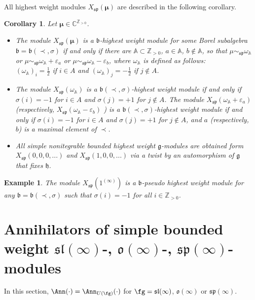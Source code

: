 \documentclass[12pt]{amsart}
\newcommand{\Z}{{\mathbb Z}}
\def\gb{\mathfrak{b}}
\def\gg{\mathfrak{g}}
\def\gh{\mathfrak{h}}
\def\gl{\mathfrak{l}}
\def\go{\mathfrak{o}}
\def\gp{\mathfrak{p}}
\def\gs{\mathfrak{s}}
\def\Z{\mathbb{Z}}
\def\gh{\mathfrak h}
\newtheorem{cor}[thm]{Corollary}
\newtheorem{examp}[thm]{Example}
\begin{document}
All highest weight modules $X_{\mathfrak{sp}}(\boldsymbol{\mu})$ are described in the following corollary.
\begin{cor} \label{cor-class-hw-sp} Let $\boldsymbol{\mu} \in {\mathbb C}^{{\mathbb Z}_{>0}}$. 
\begin{itemize}
\item[(i)] The module  $X_{\mathfrak{sp}}(\boldsymbol{\mu})$  is a $\mathfrak b$-highest weight module for some Borel subalgebra  $\gb = \gb (\prec, \sigma)$ if and only if  there are  ${\mathbb A}\subset {\mathbb Z}_{>0}$, $a \in {\mathbb A}$, $b \notin {\mathbb A}$, so that $\mu  \sim_{\mathfrak{sp}} \omega_{\mathbb A}$ or $\mu  \sim_{\mathfrak{sp}} \omega_{\mathbb A} + \varepsilon_a$ or $\mu  \sim_{\mathfrak{sp}} \omega_{\mathbb A} -\varepsilon_b$, where  $\omega_{\mathbb A}$ is defined as follows: \\
$(\omega_{\mathbb A})_i = \frac{1}{2}$ if $i \in A$ and  
$(\omega_{\mathbb A})_j = -\frac{1}{2}$ if $j \notin A$.
\item[(ii)]  The module  $X_{\mathfrak{sp}}(\omega_{\mathbb A})$ is a $\mathfrak b (\prec, \sigma )$-highest weight module if and only if $\sigma(i) =-1$ for $i \in A$ and $\sigma(j) =+1$ for $j \notin A$.  The module   $X_{\mathfrak{sp}}(\omega_{\mathbb A} + \varepsilon_a)$ (respectively, $X_{\mathfrak{sp}}(\omega_{\mathbb A}  - \varepsilon_b)$ ) is a $\mathfrak b (\prec, \sigma )$-highest weight module if and only if $\sigma(i) =-1$ for $i \in A$ and $\sigma(j) =+1$ for $j \notin A$, and $a$ (respectively, $b$) is a maximal element of $\prec$.
\item[(iii)] All simple nonitegrable bounded highest weight $\gg$-modules are obtained form $X_{\mathfrak{sp}} (0,0,0,...)$ and $X_{\mathfrak{sp}} (1,0,0,...)$ via a twist by an automorphism of $\gg$ that fixes $\gh$.
\end{itemize}
\end{cor}
\begin{examp}
The module $X_{\mathfrak{sp}} (1^{(\infty)})$ is a $\gb$-pseudo highest weight module for any $\gb = \gb (\prec, \sigma)$ such that $\sigma (i) = -1$ for all $i \in \Z_{>0}$.
\end{examp}

\section{Annihilators of simple bounded weight $\gs\gl(\infty)$-, $\go(\infty)$-, $\gs\gp(\infty)$-modules}

In this section,  $\Ann(\cdot)=\Ann_{U(\fg)}(\cdot)$ for $\fg=\gs\gl(\infty)$, $\go(\infty)$ or $\gs\gp(\infty)$.
\end{document}
